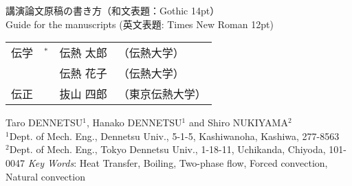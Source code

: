 \documentclass[
    paper=a4paper,      %
    article,            %
    fleqn,              %
    fontsize=10pt,      %
    jafontsize=10pt,    %
    head_space=20mm,    %
    foot_space=25mm,    %
    gutter=20mm,        %
    fore-edge=20mm      %
    ]{jlreq}            %
\begin{document}
\begin{center}
    \fontsize{14pt}{18pt}\selectfont
    {\gtfamily
    講演論文原稿の書き方（和文表題：Gothic 14pt）
    }\\\fontsize{12pt}{14pt}\selectfont
    Guide for the manuscripts (英文表題: Times New Roman 12pt)
    \vskip12pt\fontsize{10pt}{12pt}\selectfont
    \begin{tabular}{lrll}
      伝学  &$^\ast$\hspace{-3mm} &伝熱 太郎  &（伝熱大学）\\
        & &伝熱 花子  &（伝熱大学）\\
      伝正  & &抜山 四郎  &（東京伝熱大学）
    \end{tabular}
    \vskip12pt
    Taro DENNETSU$^1$, Hanako DENNETSU$^1$ and Shiro NUKIYAMA$^2$
    \\
    $^1$Dept. of Mech. Eng., Dennetsu Univ., 5-1-5, Kashiwanoha, Kashiwa, 277-8563 \\
    $^2$Dept. of Mech. Eng., Tokyo Dennetsu Univ., 1-18-11, Uchikanda, Chiyoda, 101-0047
    \vskip12pt
    \textit{Key Words}: Heat Transfer, Boiling, Two-phase flow, Forced convection, Natural convection
    \vskip12pt
\end{center}

\thispagestyle{normal}
\end{document}
